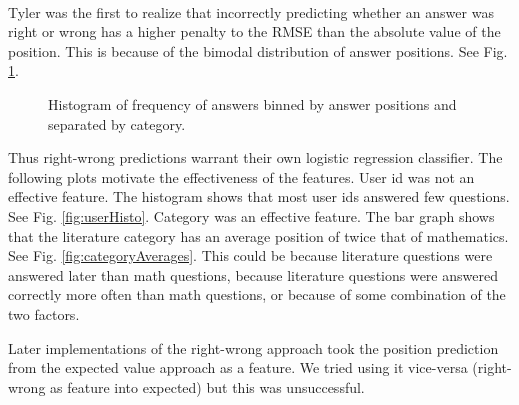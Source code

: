 \documentclass[letterpaper]{article}
\begin{document}
\paragraph{} Tyler was the first to realize that incorrectly predicting whether an answer was right or wrong has a higher penalty to the RMSE than the absolute value of the position. This is because of the bimodal distribution of answer positions. See Fig. \ref{fig:categoryPositions}.

\begin{figure}[H]
	\begin{center}
	\end{center}
	\caption{Histogram of frequency of answers binned by answer positions and separated by category.}
	\label{fig:categoryPositions}
\end{figure}

Thus right-wrong predictions warrant their own logistic regression classifier. The following plots motivate the effectiveness of the features. User id was not an effective feature. The histogram shows that most user ids answered few questions. See Fig. \ref{fig:userHisto}. Category was an effective feature. The bar graph shows that the literature category has an average position of twice that of mathematics. See Fig. \ref{fig:categoryAverages}. This could be because literature questions were answered later than math questions, because literature questions were answered correctly more often than math questions, or because of some combination of the two factors. 

Later implementations of the right-wrong approach took the position prediction from the expected value approach as a feature. We tried using it vice-versa (right-wrong as feature into expected) but this was unsuccessful.
\end{document}
